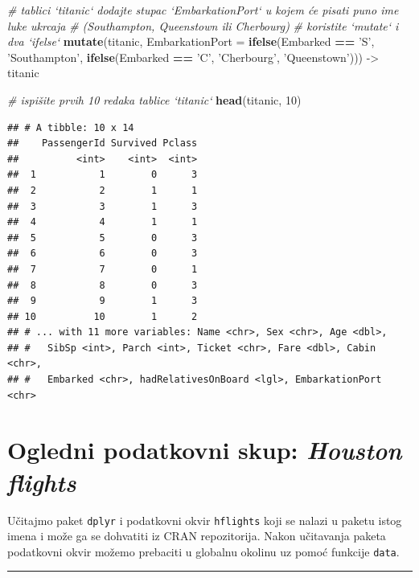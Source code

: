 \documentclass[]{book}
\newenvironment{Shaded}{\begin{snugshade}}{\end{snugshade}}
\newcommand{\KeywordTok}[1]{\textcolor[rgb]{0.13,0.29,0.53}{\textbf{#1}}}
\newcommand{\DataTypeTok}[1]{\textcolor[rgb]{0.13,0.29,0.53}{#1}}
\newcommand{\DecValTok}[1]{\textcolor[rgb]{0.00,0.00,0.81}{#1}}
\newcommand{\StringTok}[1]{\textcolor[rgb]{0.31,0.60,0.02}{#1}}
\newcommand{\CommentTok}[1]{\textcolor[rgb]{0.56,0.35,0.01}{\textit{#1}}}
\newcommand{\OperatorTok}[1]{\textcolor[rgb]{0.81,0.36,0.00}{\textbf{#1}}}
\newcommand{\NormalTok}[1]{#1}
\theoremstyle{definition}
\theoremstyle{definition}
\theoremstyle{definition}
\theoremstyle{remark}
\begin{document}
\begin{Shaded}
\begin{Highlighting}[]
\CommentTok{# tablici `titanic` dodajte stupac `EmbarkationPort` u kojem će pisati puno ime luke ukrcaja}
\CommentTok{#   (Southampton, Queenstown ili Cherbourg)}
\CommentTok{# koristite `mutate` i dva `ifelse`}
\KeywordTok{mutate}\NormalTok{(titanic, }\DataTypeTok{EmbarkationPort =} \KeywordTok{ifelse}\NormalTok{(Embarked }\OperatorTok{==}\StringTok{ 'S'}\NormalTok{, }\StringTok{'Southampton'}\NormalTok{, }
            \KeywordTok{ifelse}\NormalTok{(Embarked }\OperatorTok{==}\StringTok{ 'C'}\NormalTok{, }\StringTok{'Cherbourg'}\NormalTok{, }\StringTok{'Queenstown'}\NormalTok{))) ->}\StringTok{ }\NormalTok{titanic}

\CommentTok{# ispišite prvih 10 redaka tablice `titanic`}
\KeywordTok{head}\NormalTok{(titanic, }\DecValTok{10}\NormalTok{)}
\end{Highlighting}
\end{Shaded}

\begin{verbatim}
## # A tibble: 10 x 14
##    PassengerId Survived Pclass
##          <int>    <int>  <int>
##  1           1        0      3
##  2           2        1      1
##  3           3        1      3
##  4           4        1      1
##  5           5        0      3
##  6           6        0      3
##  7           7        0      1
##  8           8        0      3
##  9           9        1      3
## 10          10        1      2
## # ... with 11 more variables: Name <chr>, Sex <chr>, Age <dbl>,
## #   SibSp <int>, Parch <int>, Ticket <chr>, Fare <dbl>, Cabin <chr>,
## #   Embarked <chr>, hadRelativesOnBoard <lgl>, EmbarkationPort <chr>
\end{verbatim}

\section{\texorpdfstring{Ogledni podatkovni skup: \emph{Houston
flights}}{Ogledni podatkovni skup: Houston flights}}\label{ogledni-podatkovni-skup-houston-flights}

Učitajmo paket \texttt{dplyr} i podatkovni okvir \texttt{hflights} koji
se nalazi u paketu istog imena i može ga se dohvatiti iz CRAN
repozitorija. Nakon učitavanja paketa podatkovni okvir možemo prebaciti
u globalnu okolinu uz pomoć funkcije \texttt{data}.

\begin{center}\rule{0.5\linewidth}{\linethickness}\end{center}
\end{document}
